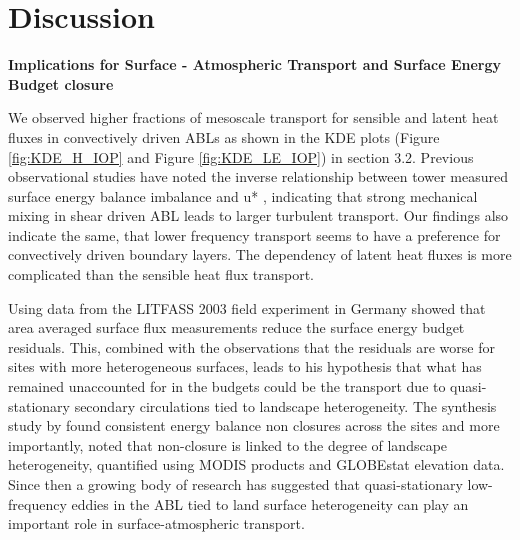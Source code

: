 \documentclass[draft]{agujournal2019}
\begin{document}
\newpage

\section{Discussion}

\textbf{Implications for Surface - Atmospheric Transport and Surface Energy Budget closure}

We observed higher fractions of  mesoscale transport for sensible and latent heat fluxes in convectively driven ABLs  as shown in the KDE plots (Figure \ref{fig:KDE_H_IOP} and Figure \ref{fig:KDE_LE_IOP}) in section 3.2. Previous observational studies have noted the inverse relationship between tower measured surface energy balance imbalance and u* \cite{stoy_data-driven_2013, eder_mesoscale_2015}, indicating that strong mechanical mixing in shear driven ABL leads to larger turbulent transport. Our findings also indicate the same, that lower frequency transport seems to have a preference for convectively driven boundary layers. The dependency of latent heat fluxes is more complicated than the sensible heat flux transport. 

Using data from the LITFASS 2003 field experiment in Germany   showed that area averaged surface flux measurements reduce the surface energy budget residuals. This, combined with the observations that the residuals are worse for sites with more heterogeneous surfaces, leads to his hypothesis that what has remained unaccounted for in the budgets could be the transport due to quasi-stationary secondary circulations tied to landscape heterogeneity. The synthesis study by  found consistent energy balance non closures across the sites and more importantly, noted that non-closure is linked to the degree of landscape heterogeneity, quantified using MODIS products and GLOBEstat elevation data. Since then a growing body of research has suggested that quasi-stationary low-frequency eddies in the ABL tied to land surface heterogeneity can play an important role in surface-atmospheric transport.
\end{document}
